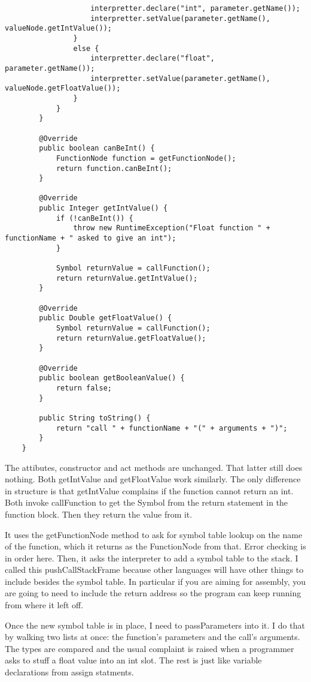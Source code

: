 {\begin{verbatim}
                    interpretter.declare("int", parameter.getName());
                    interpretter.setValue(parameter.getName(), valueNode.getIntValue());
                }
                else {
                    interpretter.declare("float", parameter.getName());
                    interpretter.setValue(parameter.getName(), valueNode.getFloatValue());
                }
            }
        }
    
        @Override
        public boolean canBeInt() {
            FunctionNode function = getFunctionNode();
            return function.canBeInt();
        }
    
        @Override
        public Integer getIntValue() {
            if (!canBeInt()) {
                throw new RuntimeException("Float function " + functionName + " asked to give an int");
            }
    
            Symbol returnValue = callFunction();
            return returnValue.getIntValue();
        }
    
        @Override
        public Double getFloatValue() {
            Symbol returnValue = callFunction();
            return returnValue.getFloatValue();
        }
    
        @Override
        public boolean getBooleanValue() {
            return false;
        }
    
        public String toString() {
            return "call " + functionName + "(" + arguments + ")";
        }
    }
\end{verbatim}
}

The attibutes, constructor and act methods are unchanged. That latter still does nothing.
Both getIntValue and getFloatValue work similarly. The only difference in structure
is that getIntValue complains if the function cannot return an int.
Both invoke callFunction to get the Symbol from the return statement in the function block.
Then they return the value from it.

It uses the getFunctionNode method to ask for symbol table lookup on the name of the function,
which it returns as the FunctionNode from that. Error checking is in order here.
Then, it asks the interpreter to add a symbol table to the stack. I called this
pushCallStackFrame because other languages will have other things to include
besides the symbol table. In particular if you are aiming for assembly, you
are going to need to include the return address so the program can keep running
from where it left off.

Once the new symbol table is in place, I need to passParameters into it.
I do that by walking two lists at once: the function's parameters and the
call's arguments. The types are compared and the usual complaint is raised
when a programmer asks to stuff a float value into an int slot.
The rest is just like variable declarations from assign statments.

